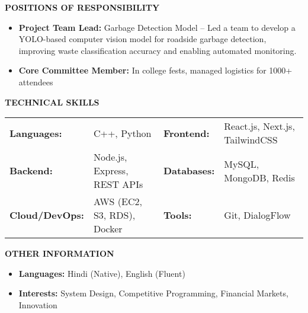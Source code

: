 \documentclass[10pt]{article}
\newcommand{\sectionheader}[1]{%
  \vspace{6pt}%
  \noindent\colorbox{sectiongray}{%
    \parbox[c][10pt]{\dimexpr\textwidth-2\fboxsep}{%
      \vspace*{\fill}%
      {\fontsize{10}{12}\selectfont\bfseries\MakeUppercase{#1}}%
      \vspace*{\fill}%
    }%
  }%
  \vspace{6pt}%
}
\begin{document}
\sectionheader{Positions of Responsibility}

\begin{itemize}
  \item \textbf{Project Team Lead:} Garbage Detection Model – Led a team to develop a YOLO-based computer vision model for roadside garbage detection, improving waste classification accuracy and enabling automated monitoring.
  \item \textbf{Core Committee Member:} In college fests, managed logistics for 1000+ attendees
\end{itemize}


\sectionheader{Technical Skills}

\begin{tabularx}{\textwidth}{@{} p{} p{} p{} X @{}}
  \textbf{Languages:} & C++, Python & \textbf{Frontend:} & React.js, Next.js, TailwindCSS \\[1.5pt]
  \textbf{Backend:} & Node.js, Express, REST APIs & \textbf{Databases:} & MySQL, MongoDB, Redis \\[1.5pt]
  \textbf{Cloud/DevOps:} & AWS (EC2, S3, RDS), Docker & \textbf{Tools:} & Git, DialogFlow \\
\end{tabularx}

\sectionheader{Other Information}

\begin{itemize}
  \item \textbf{Languages:} Hindi (Native), English (Fluent)
  \item \textbf{Interests:} System Design, Competitive Programming, Financial Markets, Innovation
\end{itemize}
\end{document}
